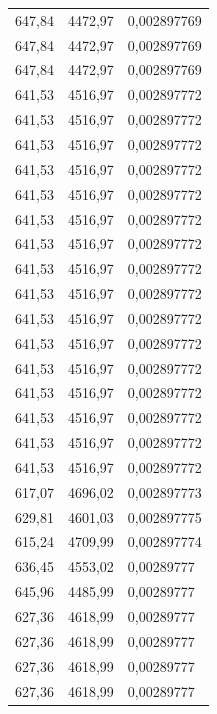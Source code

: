 \begin{center}
\begin{longtable}{|l|l|l|}
647,84            & 4472,97           & 0,002897769 \\
647,84            & 4472,97           & 0,002897769 \\
647,84            & 4472,97           & 0,002897769 \\
641,53            & 4516,97           & 0,002897772 \\
641,53            & 4516,97           & 0,002897772 \\
641,53            & 4516,97           & 0,002897772 \\
641,53            & 4516,97           & 0,002897772 \\
641,53            & 4516,97           & 0,002897772 \\
641,53            & 4516,97           & 0,002897772 \\
641,53            & 4516,97           & 0,002897772 \\
641,53            & 4516,97           & 0,002897772 \\
641,53            & 4516,97           & 0,002897772 \\
641,53            & 4516,97           & 0,002897772 \\
641,53            & 4516,97           & 0,002897772 \\
641,53            & 4516,97           & 0,002897772 \\
641,53            & 4516,97           & 0,002897772 \\
641,53            & 4516,97           & 0,002897772 \\
641,53            & 4516,97           & 0,002897772 \\
641,53            & 4516,97           & 0,002897772 \\
617,07            & 4696,02           & 0,002897773 \\
629,81            & 4601,03           & 0,002897775 \\
615,24            & 4709,99           & 0,002897774 \\
636,45            & 4553,02           & 0,00289777  \\
645,96            & 4485,99           & 0,00289777  \\
627,36            & 4618,99           & 0,00289777  \\
627,36            & 4618,99           & 0,00289777  \\
627,36            & 4618,99           & 0,00289777  \\
627,36            & 4618,99           & 0,00289777  \\

\end{longtable}
\end{center}
